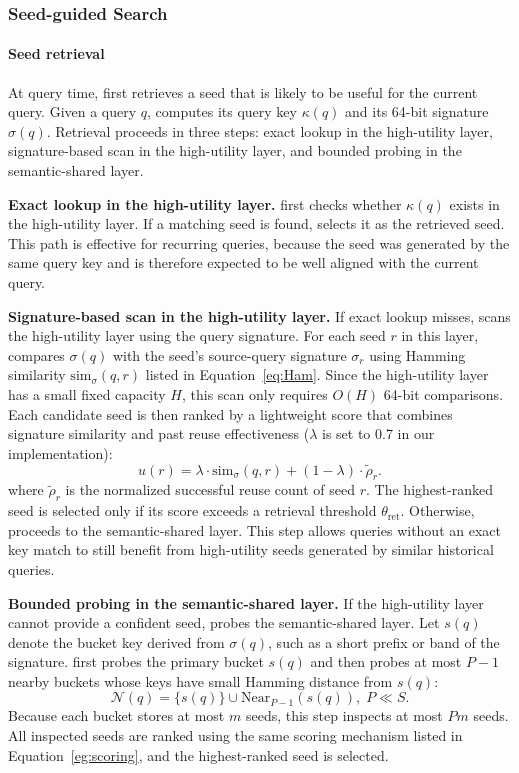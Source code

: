 \subsubsection{Seed-guided Search}
\paragraph{Seed retrieval}
At query time, \system first retrieves a seed that is likely to be useful for the current query.
Given a query $q$, \system computes its query key $\kappa(q)$ and its 64-bit signature $\sigma(q)$.
Retrieval proceeds in three steps: exact lookup in the high-utility layer, signature-based scan in the high-utility layer, and bounded probing in the semantic-shared layer.

\textbf{Exact lookup in the high-utility layer.}
\system first checks whether $\kappa(q)$ exists in the high-utility layer.
If a matching seed is found, \system selects it as the retrieved seed.
This path is effective for recurring queries, because the seed was generated by the same query key and is therefore expected to be well aligned with the current query.

\textbf{Signature-based scan in the high-utility layer.}
If exact lookup misses, \system scans the high-utility layer using the query signature.
For each seed $r$ in this layer, \system compares $\sigma(q)$ with the seed's source-query signature $\sigma_r$ using Hamming similarity $\mathrm{sim}_{\sigma}(q,r)$ listed in Equation~\eqref{eq:Ham}.
Since the high-utility layer has a small fixed capacity $H$, this scan only requires $O(H)$ 64-bit comparisons.
Each candidate seed is then ranked by a lightweight score that combines signature similarity and past reuse effectiveness ($\lambda$ is set to 0.7 in our implementation):
\begin{equation}
u(r)
=
\lambda \cdot \mathrm{sim}_{\sigma}(q,r)
+
(1-\lambda)\cdot \widetilde{\rho}_r.
\label{eg:scoring}
\end{equation}
where $\widetilde{\rho}_r$ is the normalized successful reuse count of seed $r$.
The highest-ranked seed is selected only if its score exceeds a retrieval threshold $\theta_{\mathrm{ret}}$.
Otherwise, \system proceeds to the semantic-shared layer.
This step allows queries without an exact key match to still benefit from high-utility seeds generated by similar historical queries.

\textbf{Bounded probing in the semantic-shared layer.}
If the high-utility layer cannot provide a confident seed, \system probes the semantic-shared layer.
Let $s(q)$ denote the bucket key derived from $\sigma(q)$, such as a short prefix or band of the signature.
\system first probes the primary bucket $s(q)$ and then probes at most $P-1$ nearby buckets whose keys have small Hamming distance from $s(q)$:
\begin{equation}
\mathcal{N}(q)=\{s(q)\}\cup \mathrm{Near}_{P-1}(s(q)), \; P\ll S.
\end{equation}
Because each bucket stores at most $m$ seeds, this step inspects at most $Pm$ seeds.
All inspected seeds are ranked using the same scoring mechanism listed in Equation~\eqref{eg:scoring}, and the highest-ranked seed is selected.

